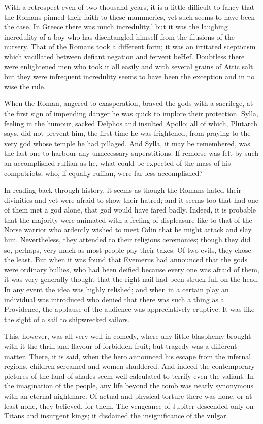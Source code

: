 \documentclass[]{book}
\begin{document}
With a retrospect even of two thousand years, it is a little difficult
to fancy that the Romans pinned their faith to these mummeries, yet such
seems to have been the case. In Greece there was much incredulity,' but
it was the laughing incredulity of a boy who has disentangled himself
from the illusions of the nursery. That of the Romans took a different
form; it was an irritated scepticism which vacillated between defiant
negation and fervent beHef. Doubtless there were enlightened men who
took it all easily and with several grains of Attic salt but they were
infrequent incredulity seems to have been the exception and in no wise
the rule.

When the Roman, angered to exasperation, braved the gods with a
sacrilege, at the first sign of impending danger he was quick to implore
their protection. Sylla, feeling in the humour, sacked Delphos and
insulted Apollo; all of which, Plutarch says, did not prevent him, the
first time he was frightened, from praying to the very god whose temple
he had pillaged. And Sylla, it may be remembered, was the last one to
harbour any unnecessary superstitions. If remorse was felt by such an
accomplished ruffian as he, what could be expected of the mass of his
compatriots, who, if equally ruffian, were far less accomplished?

In reading back through history, it seems as though the Romans hated
their divinities and yet were afraid to show their hatred; and it seems
too that had one of them met a god alone, that god would have fared
badly. Indeed, it is probable that the majority were animated with a
feeling of displeasure like to that of the Norse warrior who ardently
wished to meet Odin that he might attack and slay him. Nevertheless,
they attended to their religious ceremonies; though they did so,
perhaps, very much as most people pay their taxes. Of two evils, they
chose the least. But when it was found that Evemerus had announced that
the gods were ordinary bullies, who had been deified because every one
was afraid of them, it was very generally thought that the right nail
had been struck full on the head. In any event the idea was highly
relished; and when in a certain play an individual was introduced who
denied that there was such a thing as a Providence, the applause of the
audience was appreciatively eruptive. It was like the sight of a sail to
shipwrecked sailors.

This, however, was all very well in comedy, where any little blasphemy
brought with it the thrill and flavour of forbidden fruit; but tragedy
was a different matter. There, it is said, when the hero announced his
escape from the infernal regions, children screamed and women shuddered.
And indeed the contemporary pictures of the land of shades seem well
calculated to terrify even the valiant. In the imagination of the
people, any life beyond the tomb was nearly synonymous with an eternal
nightmare. Of actual and physical torture there was none, or at least
none, they believed, for them. The vengeance of Jupiter descended only
on Titans and insurgent kings; it disdained the insignificance of the
vulgar.
\end{document}

